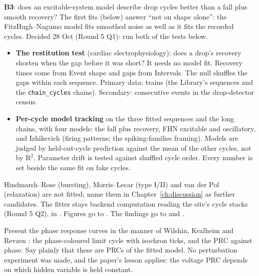 \begin{instructions}
\textbf{B3}: does an excitable-system model describe drop cycles better than a fall plus smooth recovery? The first fits
(below) answer ``not on shape alone'': the FitzHugh--Nagumo model fits smoothed noise as well as it fits the recorded
cycles. Decided 28 Oct (Round 5 Q1): run both of the tests below.
\begin{itemize}
  \item \textbf{The restitution test} (cardiac electrophysiology): does a drop's recovery shorten when the gap before
        it was short? It needs no model fit. Recovery times come from Event shape and gaps from Intervals. The null
        shuffles the gaps within each sequence. Primary data: trains (the Library's sequences and the
        \texttt{chain\_cycles} chains). Secondary: consecutive events in the drop-detector census.
  \item \textbf{Per-cycle model tracking} on the three fitted sequences and the long chains, with four models: the fall
        plus recovery, FHN excitable and oscillatory, and Izhikevich (firing patterns; the spiking-families framing).
        Models are judged by held-out-cycle prediction against the mean of the other cycles, not by R$^2$. Parameter
        drift is tested against shuffled cycle order. Every number is set beside the same fit on fake cycles.
\end{itemize}
Hindmarsh--Rose (bursting), Morris--Lecar (type I/II) and van der Pol (relaxation) are not fitted; name them in
Chapter~\ref{ch:discussion} as further candidates. The fitter stays backend computation reading the site's cycle stacks
(Round 5 Q2), in . Figures go to . The findings go to
 and .

Present the phase response curves in the manner of Wilshin, Kvalheim and Revzen \cite{wilshin2024prc}: the
phase-coloured limit cycle with isochron ticks, and the PRC against phase. Say plainly that these are PRCs of the fitted
model. No perturbation experiment was made, and the paper's lesson applies: the voltage PRC depends on which hidden
variable is held constant.
\end{instructions}

